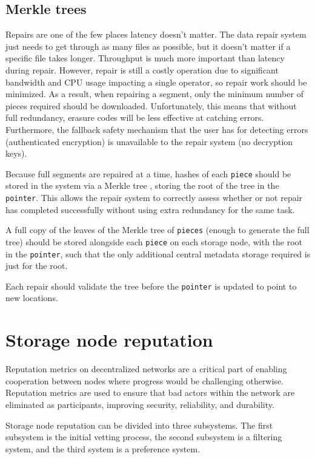 \documentclass[11pt,fleqn,openany]{book}
\newcommand{\x}[1]{{\tt #1}} \newcommand{\code}[1]{{\em #1}}
\begin{document}
\subsection{Merkle trees}

Repairs are one of the few places latency doesn't matter. The data repair system
just needs to get through as many files as possible, but it doesn't matter if
a specific file takes longer. Throughput is much more important than
latency during repair. However, repair
is still a costly operation due to significant bandwidth and CPU usage
impacting a single operator, so repair work should be minimized.
As a result, when repairing a segment,
only the minimum number of pieces required should be downloaded.
Unfortunately, this means that
without full redundancy, erasure codes will be less effective at catching
errors. Furthermore, the fallback safety mechanism that the user has for detecting
errors (authenticated encryption) is unavailable to the repair system (no
decryption keys).

Because full segments are repaired at a time, hashes of
each \x{piece} should be stored in the system via a Merkle tree
\cite{merkle-tree}, storing the root of the tree in the \x{pointer}. This allows
the repair system to correctly assess whether or not repair has completed
successfully without using extra redundancy for the same task.

A full copy of the leaves of the Merkle tree of \x{pieces} (enough to generate
the full tree) should be stored alongside each \x{piece} on each storage node,
with the root in the \x{pointer}, such that the only additional central
metadata storage required is just for the root.

Each repair should validate the tree before the \x{pointer} is updated to
point to new locations.

\section{Storage node reputation}\label{sec:concrete-reputation}

Reputation metrics on decentralized networks are a critical part of
enabling cooperation
between nodes
where progress would be challenging otherwise. Reputation metrics
are used to ensure that bad actors
within the network are eliminated as participants, improving security,
reliability, and durability.

Storage node reputation can be divided into three subsystems. The first
subsystem is the initial vetting process, the second subsystem is a filtering
system, and the third system is a preference system.
\end{document}
